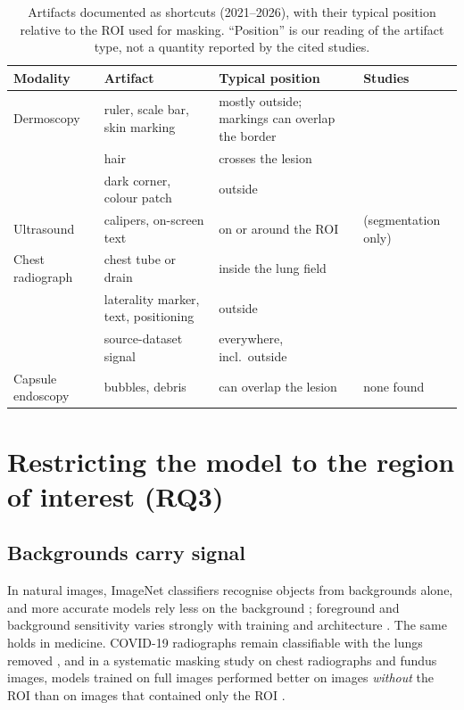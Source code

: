 \documentclass[11pt,a4paper]{article}
\begin{document}
\begin{table}[t]\centering\small
\caption{Artifacts documented as shortcuts (2021--2026), with their typical position relative to the ROI used for
masking. ``Position'' is our reading of the artifact type, not a quantity reported by the cited studies.}\label{tab:artifacts}
\begin{tabular}{P{2.3cm}P{3.6cm}P{3.3cm}P{5.9cm}}\toprule
Modality & Artifact & Typical position & Studies \\\midrule
Dermoscopy & ruler, scale bar, skin marking & mostly outside; markings can overlap the border & \citet{winkler2021scalebars,anders2022clever,pahde2023r2r} \\
 & hair & crosses the lesion & \citet{wang2024hair} \\
 & dark corner, colour patch & outside & \citet{pewton2024dca,anders2022clever} \\
Ultrasound & calipers, on-screen text & on or around the ROI & \citet{lin2024segshortcut} (segmentation only) \\
Chest radiograph & chest tube or drain & inside the lung field & \citet{rueckel2021pneumothorax,jimenez2023shortcuts} \\
 & laterality marker, text, positioning & outside & \citet{degrave2021ai} \\
 & source-dataset signal & everywhere, incl.\ outside & \citet{maguolo2021critic,sourget2025mask} \\
Capsule endoscopy & bubbles, debris & can overlap the lesion & none found \\\bottomrule
\end{tabular}\end{table}

\section{Restricting the model to the region of interest (RQ3)}\label{sec:masking}
\subsection{Backgrounds carry signal}
In natural images, ImageNet classifiers recognise objects from backgrounds alone, and more accurate models rely less on
the background \citep{xiao2021noise}; foreground and background sensitivity varies strongly with training and
architecture \citep{moayeri2022comprehensive}. The same holds in medicine. COVID-19 radiographs remain classifiable with
the lungs removed \citep{maguolo2021critic}, and in a systematic masking study on chest radiographs and fundus images,
models trained on full images performed better on images \emph{without} the ROI than on images that contained only the
ROI \citep{sourget2025mask}.
\end{document}
